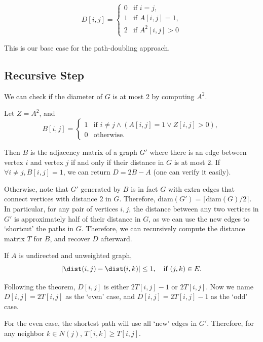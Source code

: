 \[ D[i,j] = \begin{cases}
		0 & \text{if } i = j,       \\
		1 & \text{if } A[i,j] = 1,  \\
		2 & \text{if } A^2[i,j] > 0
	\end{cases} \]

This is our base case for the path-doubling approach.

\subsection{Recursive Step}

We can check if the diameter of $G$ is at most 2 by computing $A^2$.

Let $Z=A^2$, and
\[ B[i,j] = \begin{cases}
		1 & \text{if } i \neq j \land (A[i,j] = 1 \lor Z[i,j] > 0), \\
		0 & \text{otherwise}.
	\end{cases} \]

Then $B$ is the adjacency matrix of a graph $G'$ where there is an edge between vertex $i$ and vertex $j$ if and only if their distance in $G$ is at most 2. If $\forall i \neq j, B[i,j] = 1$, we can return $D = 2B-A$ (one can verify it easily).

Otherwise, note that $G'$ generated by $B$ is in fact $G$ with extra edges that connect vertices with distance 2 in $G$. Therefore, $\text{diam}(G') = \lceil \text{diam}(G)/2 \rceil$. In particular, for any pair of vertices $i,j$, the distance between any two vertices in $G'$ is approximately half of their distance in $G$, as we can use the new edges to `shortcut' the paths in $G$. Therefore, we can recursively compute the distance matrix $T$ for $B$, and recover $D$ afterward.

\begin{theorem}
	If $A$ is undirected and unweighted graph,
	\[ |\dist(i,j) - \dist(i,k)| \le 1, \quad \text{if } (j,k)\in E. \]
\end{theorem}

Following the theorem, $D[i,j]$ is either $2T[i,j] - 1$ or $2T[i,j]$. Now we name $D[i,j] = 2T[i,j]$ as the `even' case, and $D[i,j] = 2T[i,j] - 1$ as the `odd' case.

For the even case, the shortest path will use all `new' edges in $G'$. Therefore, for any neighbor $k\in N(j)$, $T[i,k]\ge T[i,j]$.

